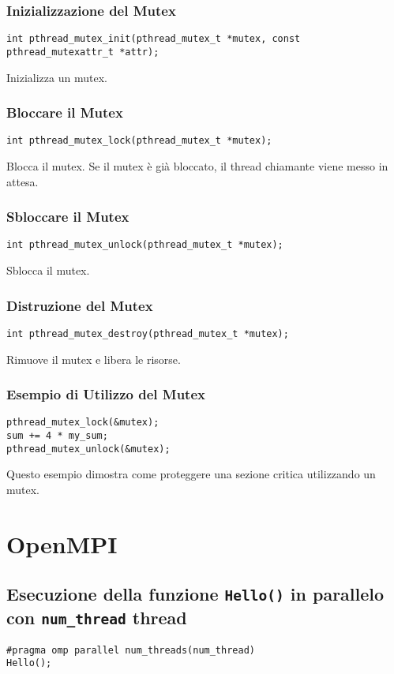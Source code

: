 \documentclass{article}
\begin{document}
\subsubsection{Inizializzazione del Mutex}
\begin{verbatim}
int pthread_mutex_init(pthread_mutex_t *mutex, const pthread_mutexattr_t *attr);
\end{verbatim}
Inizializza un mutex.

\subsubsection{Bloccare il Mutex}
\begin{verbatim}
int pthread_mutex_lock(pthread_mutex_t *mutex);
\end{verbatim}
Blocca il mutex. Se il mutex è già bloccato, il thread chiamante viene messo in attesa.

\subsubsection{Sbloccare il Mutex}
\begin{verbatim}
int pthread_mutex_unlock(pthread_mutex_t *mutex);
\end{verbatim}
Sblocca il mutex.

\subsubsection{Distruzione del Mutex}
\begin{verbatim}
int pthread_mutex_destroy(pthread_mutex_t *mutex);
\end{verbatim}
Rimuove il mutex e libera le risorse.

\subsubsection{Esempio di Utilizzo del Mutex}
\begin{verbatim}
pthread_mutex_lock(&mutex);
sum += 4 * my_sum;
pthread_mutex_unlock(&mutex);
\end{verbatim}
Questo esempio dimostra come proteggere una sezione critica utilizzando un mutex.

\section{OpenMPI}

\subsection{Esecuzione della funzione \texttt{Hello()} in parallelo con \texttt{num\_thread} thread}
\begin{verbatim}
#pragma omp parallel num_threads(num_thread)
Hello();
\end{verbatim}
\end{document}
